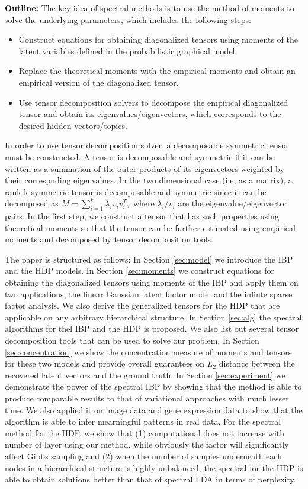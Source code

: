 \documentclass[twoside,11pt]{article}
\begin{document}
{\bf Outline:} 
The key idea of spectral methods is to use the method of moments to solve the 
underlying parameters, which includes the following steps: 
\begin{itemize}
\item Construct equations for obtaining diagonalized tensors using moments of 
the latent variables defined in the probabilistic graphical model.
\item Replace the theoretical moments with the empirical moments and obtain 
an empirical version of the diagonalized tensor.
\item Use tensor decomposition solvers to decompose the empirical diagonalized 
tensor and obtain its eigenvalues/eigenvectors, which corresponds to the desired 
hidden vectors/topics. 
\end{itemize}
In order to use tensor decomposition solver, a decomposable symmetric tensor
must be constructed. 
A tensor is decomposable and symmetric if it can be written as a summation of 
the outer products of its eigenvectors weighted by their correspnding eigenvalues. 
In the two dimensional case (i.e, as a matrix), a rank-k symmetric tensor is 
decomposable and symmetric since it can be decomposed as $M = \sum_{i=1}^k \lambda_i v_i v_i^T,$ where $\lambda_i/v_i$ are the eigenvalue/eigenvector pairs. 
In the first step, we construct a tensor that has such properties using theoretical
 moments so that the tensor can be further estimated using empirical moments 
 and decomposed by tensor decomposition tools.

The paper is structured as follows: In Section \ref{sec:model} we introduce the IBP and the HDP models. 
In Section \ref{sec:moments} we construct equations for obtaining the diagonalized tensors using moments of the IBP and apply them on two applications, the linear Gaussian latent factor model and the infinte sparse factor analysis. We also derive the generalized tensors for the HDP that are applicable on any arbitrary hierarchical structure. 
In Section \ref{sec:alg} the spectral algorithms for thel IBP and the HDP is proposed. 
We also list out several tensor decomposition tools that can be used to solve our problem. 
In Section \ref{sec:concentration} we show the concentration measure of moments 
and tensors for these two models and provide overall guarantees on $L_2$ distance
 between the recovered latent vectors and the ground truth. 
In Section \ref{sec:experiment} we demonstrate the power of the spectral IBP by 
showing that the method is able to produce comparable results to that of 
variational approaches with much lesser time. 
We also applied it on image data and gene expression data to show that the algorithm is able to infer mearningful patterns in real data. 
For the spectral method for the HDP, we show that (1) computational does not increase with number of layer using our method, while obviously the factor will significantly affect Gibbs sampling
and (2) when the number of samples underneath each nodes in a hierarchical structure 
is highly unbalanced, the spectral for the HDP is able to obtain solutions better than that of spectral LDA in terms of perplexity.
\end{document}
